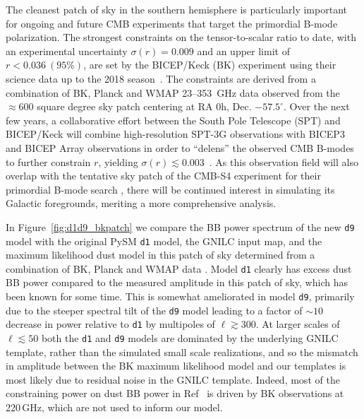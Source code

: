 \documentclass[twocolumn]{aastex631}
\newcommand{\done}{{\tt d1}}
\newcommand{\dnine}{{\tt d9}}
\begin{document}
The cleanest patch of sky in the southern hemisphere is particularly important for ongoing and future CMB experiments that target the primordial B-mode polarization. The strongest constraints on the tensor-to-scalar ratio to date, with an experimental uncertainty $\sigma(r) = 0.009$ and an upper limit of $r < 0.036~(95\%)$, are set by the BICEP/Keck (BK) experiment using their science data up to the 2018 season~\citep{Ade:2021}. The constraints are derived from a combination of BK, Planck and WMAP 23--353~GHz data observed from the $\approx 600$ square degree sky patch centering at RA 0h, Dec. $-57.5^{\circ}$. Over the next few years, a collaborative effort between the South Pole Telescope (SPT) and BICEP/Keck will combine high-resolution SPT-3G observations with BICEP3 and BICEP Array observations in order to ``delens'' the observed CMB B-modes to further constrain $r$, yielding $\sigma(r) \lesssim 0.003$~\citep{2022arXiv220316556B}. As this observation field will also overlap with the tentative sky patch of the CMB-S4 experiment for their primordial B-mode search \citep{Abazajian:2022}, there will be continued interest in simulating its Galactic foregrounds, meriting a more comprehensive analysis. 


In Figure~\ref{fig:d1d9_bkpatch} we compare the BB power spectrum of the new \dnine{} model with the original PySM \done{} model, the GNILC input map, and the maximum likelihood dust model in this patch of sky determined from a combination of BK, Planck and WMAP data \citep{Ade:2021}. Model \done{} clearly has excess dust BB power compared to the measured amplitude in this patch of sky, which has been known for some time. This is somewhat ameliorated in model \dnine{}, primarily due to the steeper spectral tilt of the \dnine{} model leading to a factor of $\sim 10$ decrease in power relative to \done{} by multipoles of $\ell \gtrsim 300$. At larger scales of $\ell \lesssim 50$ both the \done{} and \dnine{} models are dominated by the underlying GNILC template, rather than the simulated small scale realizations, and so the mismatch in amplitude between the BK maximum likelihood model and our templates is most likely due to residual noise in the GNILC template. Indeed, most of the constraining power on dust BB power in Ref~\cite{Ade:2021} is driven by BK observations at 220\,GHz, which are not used to inform our model. 
\end{document}
